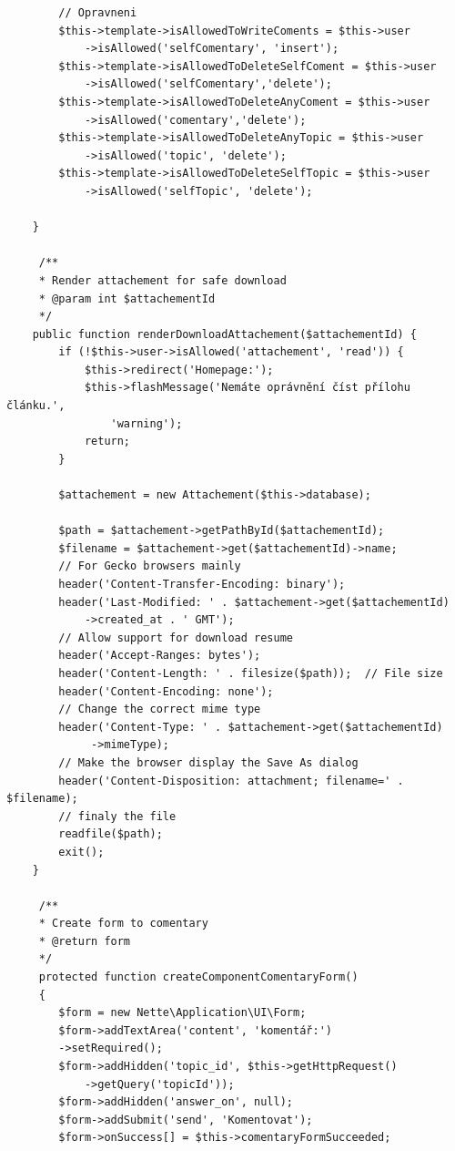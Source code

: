 \documentclass[thesis=B,czech]{FITthesis}[2012/06/26]
\begin{document}
\begin{tiny}
\begin{verbatim}
        // Opravneni
        $this->template->isAllowedToWriteComents = $this->user
            ->isAllowed('selfComentary', 'insert');
        $this->template->isAllowedToDeleteSelfComent = $this->user
            ->isAllowed('selfComentary','delete');
        $this->template->isAllowedToDeleteAnyComent = $this->user
            ->isAllowed('comentary','delete');
        $this->template->isAllowedToDeleteAnyTopic = $this->user
            ->isAllowed('topic', 'delete');
        $this->template->isAllowedToDeleteSelfTopic = $this->user
            ->isAllowed('selfTopic', 'delete');
        
    }
    
     /**
     * Render attachement for safe download
     * @param int $attachementId
     */
    public function renderDownloadAttachement($attachementId) {
        if (!$this->user->isAllowed('attachement', 'read')) {
            $this->redirect('Homepage:');
            $this->flashMessage('Nemáte oprávnění číst přílohu článku.',
                'warning');
            return;
        }
        
        $attachement = new Attachement($this->database);
 
        $path = $attachement->getPathById($attachementId);
        $filename = $attachement->get($attachementId)->name;
        // For Gecko browsers mainly        
        header('Content-Transfer-Encoding: binary'); 
        header('Last-Modified: ' . $attachement->get($attachementId)
            ->created_at . ' GMT');
        // Allow support for download resume
        header('Accept-Ranges: bytes');
        header('Content-Length: ' . filesize($path));  // File size
        header('Content-Encoding: none');
        // Change the correct mime type
        header('Content-Type: ' . $attachement->get($attachementId)
             ->mimeType);
        // Make the browser display the Save As dialog
        header('Content-Disposition: attachment; filename=' . $filename);
        // finaly the file
        readfile($path);
        exit();
    }
    
     /**
     * Create form to comentary
     * @return form
     */
     protected function createComponentComentaryForm()
     {
        $form = new Nette\Application\UI\Form;
        $form->addTextArea('content', 'komentář:')
        ->setRequired();
        $form->addHidden('topic_id', $this->getHttpRequest()
            ->getQuery('topicId'));
        $form->addHidden('answer_on', null);
        $form->addSubmit('send', 'Komentovat');
        $form->onSuccess[] = $this->comentaryFormSucceeded;
    

\end{verbatim}
\end{tiny}
\end{document}
